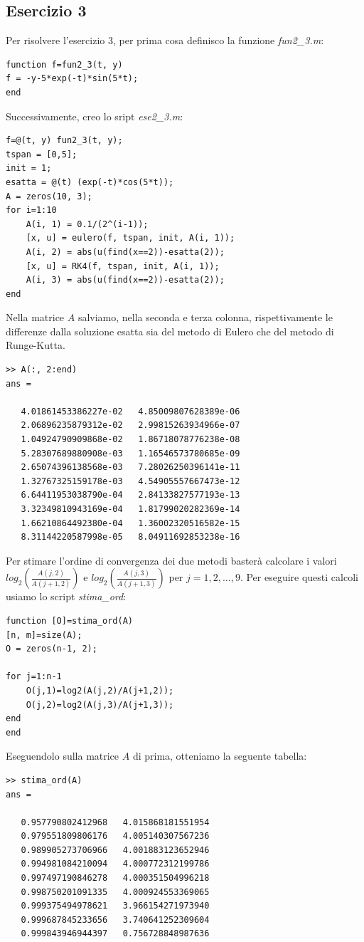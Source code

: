 \documentclass[11pt,a4paper,twoside,openright,titlepage,
headinclude,footinclude,BCOR5mm,
numbers=noenddot,cleardoublepage=empty,
tablecaptionabove]{scrbook}
\begin{document}
\newpage
\subsection{Esercizio 3}
Per risolvere l'esercizio 3, per prima cosa definisco la funzione \emph{fun2\_3.m}:
\begin{lstlisting}[frame=trBL]
function f=fun2_3(t, y)
f = -y-5*exp(-t)*sin(5*t);
end
\end{lstlisting}

Successivamente, creo lo sript \emph{ese2\_3.m}:
\begin{lstlisting}[frame=trBL]
f=@(t, y) fun2_3(t, y);
tspan = [0,5];
init = 1;
esatta = @(t) (exp(-t)*cos(5*t));
A = zeros(10, 3);
for i=1:10
    A(i, 1) = 0.1/(2^(i-1));
    [x, u] = eulero(f, tspan, init, A(i, 1));
    A(i, 2) = abs(u(find(x==2))-esatta(2));
    [x, u] = RK4(f, tspan, init, A(i, 1));
    A(i, 3) = abs(u(find(x==2))-esatta(2));
end
\end{lstlisting}
Nella matrice $A$ salviamo, nella seconda e terza colonna, rispettivamente le differenze dalla soluzione esatta
sia del metodo di Eulero che del metodo di Runge-Kutta.
\begin{lstlisting}[frame = lines]
>> A(:, 2:end)
ans =

   4.01861453386227e-02   4.85009807628389e-06
   2.06896235879312e-02   2.99815263934966e-07
   1.04924790909868e-02   1.86718078776238e-08
   5.28307689880908e-03   1.16546573780685e-09
   2.65074396138568e-03   7.28026250396141e-11
   1.32767325159178e-03   4.54905557667473e-12
   6.64411953038790e-04   2.84133827577193e-13
   3.32349810943169e-04   1.81799020282369e-14
   1.66210864492380e-04   1.36002320516582e-15
   8.31144220587998e-05   8.04911692853238e-16
\end{lstlisting}
Per stimare l'ordine di convergenza dei due metodi basterà calcolare i valori $log_{2}(\frac{A(j,2)}{A(j+1,2)})$ e 
$log_{2}(\frac{A(j,3)}{A(j+1,3)})$ per $j=1, 2, \dots, 9$. Per eseguire questi calcoli usiamo lo script \emph{stima\_ord}:
\begin{lstlisting}[frame = trBL]
function [O]=stima_ord(A)
[n, m]=size(A);
O = zeros(n-1, 2);

for j=1:n-1
    O(j,1)=log2(A(j,2)/A(j+1,2));
    O(j,2)=log2(A(j,3)/A(j+1,3));
end
end
\end{lstlisting}
Eseguendolo sulla matrice $A$ di prima, otteniamo la seguente tabella:
\begin{lstlisting}[frame = lines]
>> stima_ord(A)
ans =

   0.957790802412968   4.015868181551954
   0.979551809806176   4.005140307567236
   0.989905273706966   4.001883123652946
   0.994981084210094   4.000772312199786
   0.997497190846278   4.000351504996218
   0.998750201091335   4.000924553369065
   0.999375494978621   3.966154271973940
   0.999687845233656   3.740641252309604
   0.999843946944397   0.756728848987636

\end{lstlisting}
\end{document}
